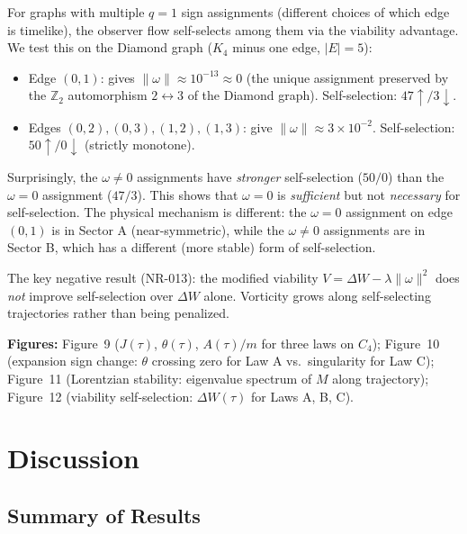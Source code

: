 \documentclass[11pt]{article}
\theoremstyle{definition}
\theoremstyle{remark}
\newcommand{\Met}{M}
\newcommand{\vort}{\omega}
\newcommand{\expan}{\theta}
\begin{document}
For graphs with multiple $q = 1$ sign assignments (different choices of
which edge is timelike), the observer flow self-selects among them via
the viability advantage. We test this on the Diamond graph
($K_4$ minus one edge, $|E| = 5$):

\begin{itemize}
\item Edge $(0,1)$: gives $\|\vort\| \approx 10^{-13} \approx 0$
  (the unique assignment preserved by the $\mathbb{Z}_2$ automorphism
  $2 \leftrightarrow 3$ of the Diamond graph).
  Self-selection: $47\uparrow / 3\downarrow$.

\item Edges $(0,2), (0,3), (1,2), (1,3)$: give $\|\vort\| \approx 3 \times 10^{-2}$.
  Self-selection: $50\uparrow / 0\downarrow$ (strictly monotone).
\end{itemize}

Surprisingly, the $\vort \neq 0$ assignments have \emph{stronger}
self-selection ($50/0$) than the $\vort = 0$ assignment ($47/3$). This
shows that $\vort = 0$ is \emph{sufficient} but not \emph{necessary}
for self-selection. The physical mechanism is different: the $\vort = 0$
assignment on edge $(0,1)$ is in Sector A (near-symmetric), while the
$\vort \neq 0$ assignments are in Sector B, which has a different (more
stable) form of self-selection.

The key negative result (NR-013): the modified viability
$V = \Delta W - \lambda\|\vort\|^2$ does \emph{not} improve self-selection
over $\Delta W$ alone. Vorticity grows along self-selecting trajectories
rather than being penalized.

\textbf{Figures:} Figure~9 ($J(\tau)$, $\expan(\tau)$, $A(\tau)/m$ for
three laws on $C_4$); Figure~10 (expansion sign change: $\expan$ crossing
zero for Law A vs.\ singularity for Law C); Figure~11 (Lorentzian
stability: eigenvalue spectrum of $\Met$ along trajectory); Figure~12
(viability self-selection: $\Delta W(\tau)$ for Laws A, B, C).


\section{Discussion}
\label{sec:discussion}

\subsection{Summary of Results}
\end{document}
